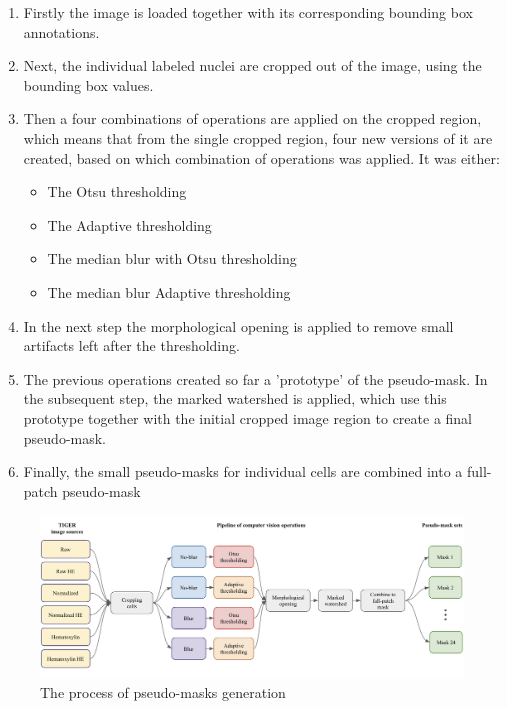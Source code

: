 \begin{enumerate}
    \item Firstly the image is loaded together with its corresponding bounding box annotations.
    \item Next, the individual labeled nuclei are cropped out of the image, using the bounding box values.
    \item Then a four combinations of operations are applied on the cropped region, which means that from the single cropped region, four new versions of it are created, based on which combination of operations was applied. It was either:
    \begin{itemize}
        \item The Otsu thresholding
        \item The Adaptive thresholding
        \item The median blur with Otsu thresholding
        \item The median blur Adaptive thresholding
    \end{itemize}
    \item In the next step the morphological opening is applied to remove small artifacts left after the thresholding.
    \item The previous operations created so far a 'prototype' of the pseudo-mask. In the subsequent step, the marked watershed is applied, which use this prototype together with the initial cropped image region to create a final pseudo-mask.
    \item Finally, the small pseudo-masks for individual cells are combined into a full-patch pseudo-mask
\end{enumerate}

\begin{figure}[H]
\begin{centering}
\includegraphics[width=\textwidth]{assets/images/for_presentation/dg-mask-gen.png}
\par\end{centering}
\caption{The process of pseudo-masks generation 
\label{fig:dg-mask-gen}}
\end{figure}

